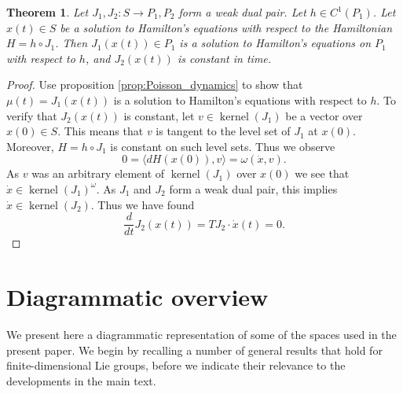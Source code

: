 \documentclass[12pt]{amsart}
\newtheorem{thm}{Theorem}[section]
\DeclareMathOperator{\kernel}{kernel}
\begin{document}
  \begin{thm} \label{thm:dual_pairs}
    Let $J_1,J_2:S \to P_1,P_2$ form a weak dual pair.
    Let $h \in C^1(P_1)$.
    Let $x(t) \in S$ be a solution to Hamilton's equations
    with respect to the Hamiltonian $H = h \circ J_1$.
    Then $J_1\left( x(t) \right) \in P_1$ is a solution
    to Hamilton's equations on $P_1$ with respect to $h$,
    and $J_2( x(t))$ is constant in time.
  \end{thm}
  \begin{proof}
    Use proposition \ref{prop:Poisson_dynamics} to show that
    $\mu(t) = J_1 (x(t))$ is a solution to Hamilton's equations
    with respect to $h$.
    To verify that $J_2( x(t) )$ is constant,
    let $v \in \kernel(J_1)$ be a vector over $x(0) \in S$.
    This means that $v$ is tangent to the level set of $J_1$ at $x(0)$.
    Moreover, $H = h \circ J_1$ is constant on such level sets.
    Thus we observe
    \begin{equation*}
      0 = \langle dH(x(0)) , v \rangle =
      \omega \left( \dot{x} , v \right).
    \end{equation*}
    As $v$ was an arbitrary element of $\kernel(J_1)$ over $x(0)$
    we see that $\dot{x} \in \kernel(J_1)^\omega$.
    As $J_1$ and $J_2$ form a weak dual pair, this implies $\dot{x}  \in \kernel(J_2)$.
    Thus we have found
    \begin{equation*}
      \frac{d}{dt} J_2( x(t)) = TJ_2 \cdot \dot{x}(t)  
      = 0.
    \end{equation*}
  \end{proof}

\section{Diagrammatic overview} \label{app:diagramatic}
We present here a diagrammatic representation of some of the spaces used in the present paper. We begin by recalling a number of general results that hold for finite-dimensional Lie groups, before we indicate their relevance to the developments in the main text.
\end{document}
